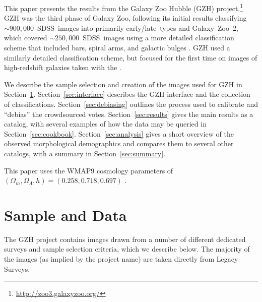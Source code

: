 \documentclass[twocolumn]{aastex6}
\begin{document}
This paper presents the results from the Galaxy Zoo Hubble (GZH) project.\footnote{\url{http://zoo3.galaxyzoo.org/}} GZH was the third phase of Galaxy Zoo, following its initial results classifying $\sim900,000$~SDSS~images into primarily early/late~types \citep{lin11} and Galaxy~Zoo~2, which covered $\sim250,000$~SDSS~images using a more detailed classification scheme that included bars, spiral arms, and galactic bulges \citep{wil13}. GZH used a similarly detailed classification scheme, but focused for the first time on images of high-redshift galaxies taken with the \hubble.

We describe the sample selection and creation of the images used for GZH in Section~\ref{sec:data}. Section~\ref{sec:interface} describes the GZH interface and the collection of classifications. Section~\ref{sec:debiasing} outlines the process used to calibrate and ``debias'' the crowdsourced votes. Section~\ref{sec:results} gives the main results as a catalog, with several examples of how the data may be queried in Section~\ref{sec:cookbook}. Section~\ref{sec:analysis} gives a short overview of the observed morphological demographics and compares them to several other catalogs, with a summary in Section~\ref{sec:summary}.

This paper uses the WMAP9 cosmology parameters of $(\Omega_m,\Omega_\Lambda,h)=(0.258,0.718,0.697)$ \citep{hin13}.


\section{Sample and Data}\label{sec:data}

The GZH project contains images drawn from a number of different dedicated surveys and sample selection criteria, which we describe below. The majority of the images (as implied by the project name) are taken directly from \hst{} Legacy Surveys.
\end{document}
